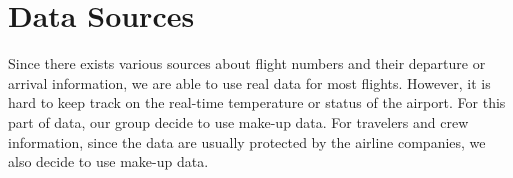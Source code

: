 \documentclass{article}
\begin{document}
	\section{Data Sources}
	Since there exists various sources about flight numbers and their departure or arrival information, we are able to use real data for most flights. However, it is hard to keep track on the real-time temperature or status of the airport. For this part of data, our group decide to use make-up data. For travelers and crew information, since the data are usually protected by the airline companies, we also decide to use make-up data. 
	
\end{document}
